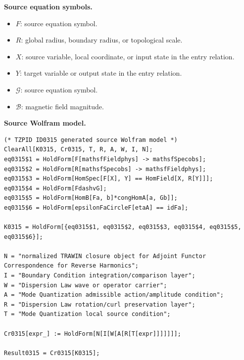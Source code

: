 \begin{minipage}[t]{0.49\linewidth}
\begingroup
\small
\raggedright
\textbf{Source equation symbols.}\par
\begin{itemize}[leftmargin=1.35em,itemsep=1pt,topsep=1pt,parsep=0pt]
    \item $F$: source equation symbol.
    \item $R$: global radius, boundary radius, or topological scale.
    \item $X$: source variable, local coordinate, or input state in the entry relation.
    \item $Y$: target variable or output state in the entry relation.
    \item $\mathcal{G}$: source equation symbol.
    \item $\mathcal{B}$: magnetic field magnitude.
\end{itemize}
\endgroup
\end{minipage}\hfill
\begin{minipage}[t]{0.47\linewidth}
\begingroup
\scriptsize
\raggedright
\textbf{Source Wolfram model.}\par
\begin{Verbatim}[fontsize=\tiny,breaklines=true,breakanywhere=true]
(* TZPID ID0315 generated source Wolfram model *)
ClearAll[K0315, Cr0315, T, R, A, W, I, N];
eq0315$1 = HoldForm[F[mathsfFieldphys] -> mathsfSpecobs];
eq0315$2 = HoldForm[R[mathsfSpecobs] -> mathsfFieldphys];
eq0315$3 = HoldForm[HomSpec[F[X], Y] == HomField[X, R[Y]]];
eq0315$4 = HoldForm[FdashvG];
eq0315$5 = HoldForm[HomB[Fa, b]*congHomA[a, Gb]];
eq0315$6 = HoldForm[epsilonFaCircleF[etaA] == idFa];

K0315 = HoldForm[{eq0315$1, eq0315$2, eq0315$3, eq0315$4, eq0315$5, eq0315$6}];

N = "normalized TRAWIN closure object for Adjoint Functor Correspondence for Reverse Harmonics";
I = "Boundary Condition integration/comparison layer";
W = "Dispersion Law wave or operator carrier";
A = "Mode Quantization admissible action/amplitude condition";
R = "Dispersion Law rotation/curl preservation layer";
T = "Mode Quantization local source condition";

Cr0315[expr_] := HoldForm[N[I[W[A[R[T[expr]]]]]]];

Result0315 = Cr0315[K0315];
\end{Verbatim}
\endgroup
\end{minipage}

